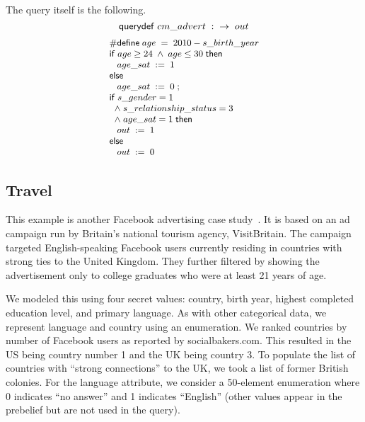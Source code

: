 The query itself is the following.
$$ \squerydefk \; cm\text{\_}advert \; : \; \; \ra \; out$$
\begin{displaymath}{\small
\begin{array}{l}
  \psdefine{age}{\ebinop{-}{2010}{s\text{\_}birth\text{\_}year}}\\
  \sifk \; \lbinop{\wedge}{\lreln{\geq}{age}{24}}{\lreln{\leq}{age}{30}} \; \sthenk\\
  \;\;\;\sassign{age\text{\_}sat}{1}\\
  \selsek\\
  \;\;\;\sassign{age\text{\_}sat}{0}\; ;\\
  \sifk \; \lbinop{\wedge}{\lbinop{\wedge}{\lreln{=}{s\text{\_}gender}{1}\\\;}{\lreln{=}{s\text{\_}relationship\text{\_}status}{3}\\\;}}{\lreln{=}{age\text{\_}sat}{1}} \; \sthenk\\
  \;\;\;\sassign{out}{1}\\
  \selsek\\
  \;\;\;\sassign{out}{0}\\
\end{array}
}
\end{displaymath}

\vspace{5mm} %

\subsection{Travel}

This example is another Facebook advertising case
study~\cite{visitbritain-case-study}.  It is based on an ad campaign
run by Britain's national tourism agency, VisitBritain.  The campaign
targeted English-speaking Facebook users currently residing in
countries with strong ties to the United Kingdom.  They further
filtered by showing the advertisement only to college graduates who
were at least 21 years of age.

We modeled this using four secret values: country, birth year, highest
completed education level, and primary language.  As with other
categorical data, we represent language and country using an
enumeration.  We ranked countries by number of Facebook users as
reported by socialbakers.com.  This resulted in the US being country
number 1 and the UK being country 3.  To populate the list of
countries with ``strong connections'' to the UK, we took a list of
former British colonies.  For the language attribute, we consider a
50-element enumeration where 0 indicates ``no answer'' and 1 indicates
``English'' (other values appear in the prebelief but are not used in
the query).

